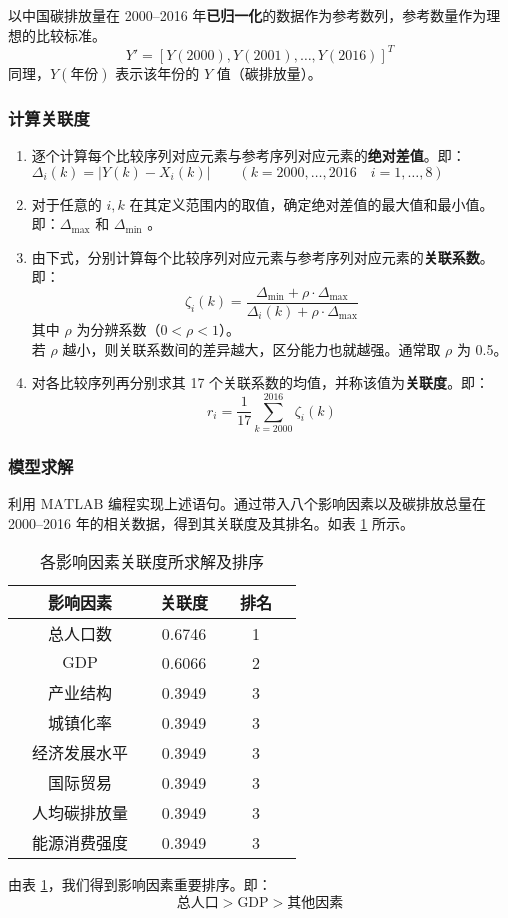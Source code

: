       以中国碳排放量在 2000--2016 年\textbf{已归一化}的数据作为参考数列，参考数量作为理想的比较标准。
      \[
        Y' = [Y(2000),Y(2001),\ldots,Y(2016)]^T
      \]
      同理，$Y(\text{年份})$ 表示该年份的 $Y$ 值（碳排放量）。

    \subsubsection{计算关联度}
      \begin{enumerate}
        \item 逐个计算每个比较序列对应元素与参考序列对应元素的\textbf{绝对差值}。即：$\Delta_i(k)=|Y(k)-X_i(k)|\qquad (k=2000,\dots,2016\quad i=1,\dots,8)$
        \item 对于任意的 $i,k$ 在其定义范围内的取值，确定绝对差值的最大值和最小值。即：$\Delta_\text{max}$ 和 $\Delta_\text{min}$ 。
        \item 由下式，分别计算每个比较序列对应元素与参考序列对应元素的\textbf{关联系数}。即：
          \[
            \zeta_i(k)=\frac{\Delta_\text{min}+\rho\cdot\Delta_\text{max}}{\Delta_i(k)+\rho\cdot\Delta_\text{max}}
          \]
          其中 $\rho$ 为分辨系数（$0<\rho<1$）。\\
          若 $\rho$ 越小，则关联系数间的差异越大，区分能力也就越强。通常取 $\rho$ 为 0.5。
        \item 对各比较序列再分别求其 17 个关联系数的均值，并称该值为\textbf{关联度}\cite{de2013}。即：
          \[
            r_i=\frac{1}{17}\sum_{k=2000}^{2016} \zeta_i(k)
          \]
      \end{enumerate}

    \subsubsection{模型求解}
      利用 $\mathrm{MATLAB}$ 编程实现上述语句。通过带入八个影响因素以及碳排放总量在 2000--2016 年的相关数据，得到其关联度及其排名。如表 \ref{tab:guanlianxu0.5} 所示。
      \begin{table}[htb]
        \centering
        \caption{各影响因素关联度所求解及排序}
        \begin{tabular*}{0.618\paperwidth}{@{\extracolsep{\fill}}ccccccc}
          \toprule[1.5pt]
          &影响因素 && 关联度 && 排名 &\\
          \midrule[1pt]
          &总人口数 && 0.6746 && 1 &\\
          &$\mathrm{GDP}$ && 0.6066 && 2 &\\
          &产业结构 && 0.3949 && 3 &\\
          &城镇化率 && 0.3949 && 3 &\\
          &经济发展水平 && 0.3949 && 3 &\\
          &国际贸易 && 0.3949 && 3 &\\
          &人均碳排放量 && 0.3949 && 3 &\\
          &能源消费强度 && 0.3949 && 3 &\\
          \bottomrule[1.5pt]
        \end{tabular*}
        \label{tab:guanlianxu0.5}
      \end{table}

      由表 \ref{tab:guanlianxu0.5}，我们得到影响因素重要排序。即：
      \[
        \text{总人口}>\textrm{GDP}>\text{其他因素}
      \]